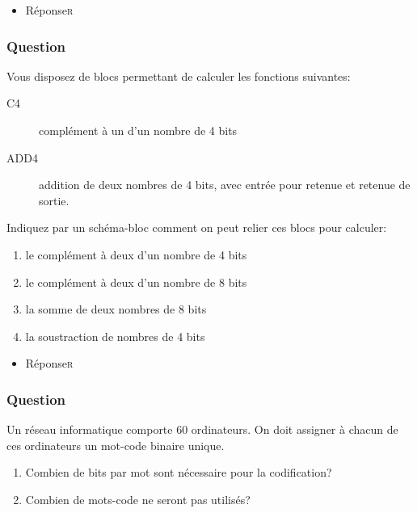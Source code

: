 \documentclass[11pt]{article}
\begin{document}
\begin{itemize}
\item Réponse\hfill{}\textsc{r}
\label{sec:org671a93e}
\end{itemize}

\subsubsection*{Question}
\label{sec:org9ffa888}
Vous disposez de blocs permettant de calculer les fonctions
   suivantes:

\begin{description}
\item[{C4}] complément à un d'un nombre de 4 bits

\item[{ADD4}] addition de deux nombres de 4 bits, avec entrée pour retenue et
retenue de sortie.
\end{description}

Indiquez par un schéma-bloc comment on peut relier ces blocs pour
calculer:

\begin{enumerate}
\item le complément à deux d'un nombre de 4 bits

\item le complément à deux d'un nombre de 8 bits

\item la somme de deux nombres de 8 bits

\item la soustraction de nombres de 4 bits
\end{enumerate}

\begin{itemize}
\item Réponse\hfill{}\textsc{r}
\label{sec:org009c572}
\end{itemize}

\subsubsection*{Question}
\label{sec:org482ca76}
Un réseau informatique comporte 60 ordinateurs. On doit assigner à
   chacun de ces ordinateurs un mot-code binaire unique.

\begin{enumerate}
\item Combien de bits par mot sont nécessaire pour la codification?

\item Combien de mots-code ne seront pas utilisés?
\end{enumerate}
\end{document}
